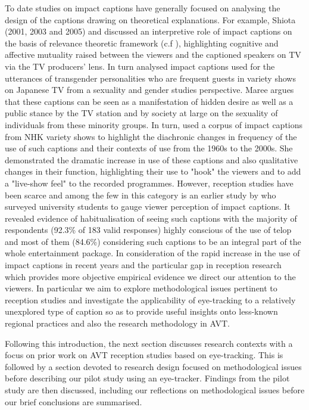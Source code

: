 \documentclass[output=paper]{langsci/langscibook}
\begin{document}
To date studies on impact captions have generally focused on analysing the design of the captions drawing on theoretical explanations. For example, Shiota (2001, 2003 and 2005) and \citet{Sasamoto2014} discussed an interpretive role of impact captions on the basis of relevance theoretic framework (c.f \citet{Sperber1986second}), highlighting cognitive and affective mutuality raised between the viewers and the captioned speakers on TV via the TV producers' lens. In turn \citet{Maree2014} analysed impact captions used for the utterances of transgender personalities who are frequent guests in variety shows on Japanese TV from a sexuality and gender studies perspective. Maree argues that these captions can be seen as a manifestation of hidden desire as well as a public stance by the TV station and by society at large on the sexuality of individuals from these minority groups. In turn, \citet{Shitara2012} used a corpus of impact captions from NHK variety shows to highlight the diachronic changes in frequency of the use of such captions and their contexts of use from the 1960s to the 2000s. She demonstrated the dramatic increase in use of these captions and also qualitative changes in their function, highlighting their use to "hook" the viewers and to add a "live-show feel" to the recorded programmes. However, reception studies have been scarce and among the few in this category is an earlier study by \citet{Kimura2000} who surveyed university students to gauge viewer perception of impact captions. It revealed evidence of habitualisation of seeing such captions with the majority of respondents (92.3\% of 183 valid responses) highly conscious of the use of telop and most of them (84.6\%) considering such captions to be an integral part of the whole entertainment package. In consideration of the rapid increase in the use of impact captions in recent years \citep[pg. 50]{Kato2012} and the particular gap in reception research which provides more objective empirical evidence we direct our attention to the viewers. In particular we aim to explore methodological issues pertinent to reception studies and investigate the applicability of eye-tracking to a relatively unexplored type of caption so as to provide useful insights onto less-known regional practices and also the research methodology in AVT.  



Following this introduction, the next section discusses research contexts with a focus on prior work on AVT reception studies based on eye-tracking. This is followed by a section devoted to research design focused on methodological issues before describing our pilot study using an eye-tracker. Findings from the pilot study are then discussed, including our reflections on methodological issues before our brief conclusions are summarised. 
\end{document}
